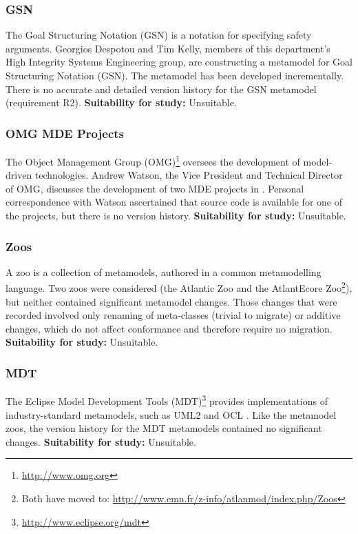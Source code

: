 \subsubsection{GSN}
\label{par:gsn}
The Goal Structuring Notation (GSN) \cite{kelly99thesis} is a notation for specifying safety arguments. Georgios Despotou and Tim Kelly, members of this department's High Integrity Systems Engineering group, are constructing a metamodel for Goal Structuring Notation (GSN). The metamodel has been developed incrementally. There is no accurate and detailed version history for the GSN metamodel (requirement R2). \textbf{Suitability for study:} Unsuitable.

\subsubsection{OMG MDE Projects}
\label{par:omg}
The Object Management Group (OMG)\footnote{\url{http://www.omg.org}} oversees the development of model-driven technologies. Andrew Watson, the Vice President and Technical Director of OMG, discusses the development of two MDE projects in \cite{watson08mdahistory}. Personal correspondence with Watson ascertained that source code is available for one of the projects, but there is no version history. \textbf{Suitability for study:} Unsuitable.


\subsubsection{Zoos}
\label{par:zoos}
A zoo is a collection of metamodels, authored in a common metamodelling language. Two zoos were considered (the Atlantic Zoo and the AtlantEcore Zoo\footnote{Both have moved to: \url{http://www.emn.fr/z-info/atlanmod/index.php/Zoos}}), but neither contained significant metamodel changes. Those changes that were recorded involved only renaming of meta-classes (trivial to migrate) or additive changes, which do not affect conformance and therefore require no migration. \textbf{Suitability for study:} Unsuitable.

\subsubsection{MDT}
The Eclipse Model Development Tools (MDT)\footnote{\url{http://www.eclipse.org/mdt}} provides implementations of industry-standard metamodels, such as UML2 \cite{uml212} and OCL \cite{ocl2}. Like the metamodel zoos, the version history for the MDT metamodels contained no significant changes. \textbf{Suitability for study:} Unsuitable.

